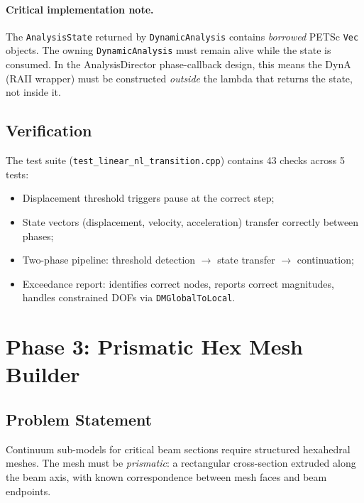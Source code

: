 \paragraph{Critical implementation note.}
The \texttt{AnalysisState} returned by \texttt{DynamicAnalysis} contains
\emph{borrowed} PETSc \texttt{Vec} objects.  The owning
\texttt{DynamicAnalysis} must remain alive while the state is consumed.
In the AnalysisDirector phase-callback design, this means the DynA (RAII
wrapper) must be constructed \emph{outside} the lambda that returns the
state, not inside it.

\subsection{Verification}

The test suite (\texttt{test\_linear\_nl\_transition.cpp}) contains 43
checks across 5 tests:
\begin{itemize}
  \item Displacement threshold triggers pause at the correct step;
  \item State vectors (displacement, velocity, acceleration) transfer
        correctly between phases;
  \item Two-phase pipeline: threshold detection $\to$ state transfer $\to$
        continuation;
  \item Exceedance report: identifies correct nodes, reports correct
        magnitudes, handles constrained DOFs via \texttt{DMGlobalToLocal}.
\end{itemize}


\section{Phase 3: Prismatic Hex Mesh Builder}
\label{sec:phase3_prismatic}

\subsection{Problem Statement}

Continuum sub-models for critical beam sections require structured
hexahedral meshes.  The mesh must be \emph{prismatic}: a rectangular
cross-section extruded along the beam axis, with known correspondence
between mesh faces and beam endpoints.


